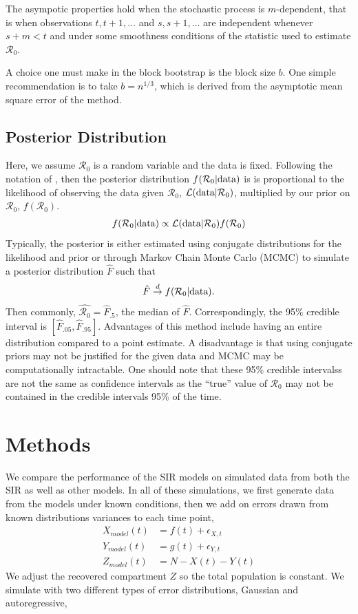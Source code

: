 \message{ !name(draft_v13.tex)}\documentclass[12pt]{article}
\newcommand{\rr}{\ensuremath{\mathcal{R}_0}}
\begin{document}
The asympotic properties hold when the stochastic process is $m$-dependent, that is when observations $t, t+1, \dots$ and $s, s+1, \dots$ are independent whenever $s+m < t$ and under some smoothness conditions of the statistic used to estimate $\rr$.

A choice one must make in the block bootstrap is the block size $b$.  One simple recommendation is to take $b= n^{1/3}$, which is derived from the asymptotic mean square error of the method.


\subsection{Posterior Distribution}
Here, we assume $\rr$ is a random variable and the data is fixed.  Following the notation of \cite{wasserman2004}, then the posterior distribution $f(\rr | \textnormal{data})$ is is proportional to the likelihood of observing the data given $\rr$, $\mathcal{L}(\textnormal{data}|\rr)$, multiplied by our prior on $\rr$, $f(\rr)$. 
\begin{align*}
f(\rr | \textnormal{data} ) \propto \mathcal{L}(\textnormal{data} | \rr) f(\rr)
\end{align*}
 Typically, the posterior is either estimated using conjugate distributions for the likelihood and prior or through Markov Chain Monte Carlo (MCMC) to simulate a posterior distribution $\hat{F}$ such that
\begin{align*}
\hat{F} \overset{d}{\to} f(\rr| \textnormal{data}).
\end{align*}
Then commonly, $\hat{\rr} = \hat{F}_{.5}$, the median of $\hat{F}$.  Correspondingly, the 95\% credible interval is $\left[\hat{F}_{.05}, \hat{F}_{.95} \right ]$. Advantages of this method include having an entire distribution compared to a point estimate.  A disadvantage is that using conjugate priors may not be justified for the given data and MCMC may be computationally intractable.  One should note that these 95\% credible intervalss are not the same as confidence intervals as the ``true'' value of $\rr$ may not be contained in the credible intervals 95\% of the time.





\section{Methods}\label{sec:sim-res}

We compare the performance of the SIR models on simulated data from both the SIR as well as other models. In all of these simulations, we first generate data from the models under known conditions, then we add on errors drawn from known distributions variances to each time point,
\begin{align}\label{eq:sim-models}
  X_{model}(t) &= f(t) + \epsilon_{X,t} \\
  Y_{model}(t) &= g(t) + \epsilon_{Y,t} \nonumber\\
  Z_{model}(t) &= N - X(t) - Y(t)\nonumber 
\end{align}
We adjust the recovered compartment $Z$ so the total population is constant. 
We simulate with two different types of error distributions, Gaussian and autoregressive,
\end{document}

